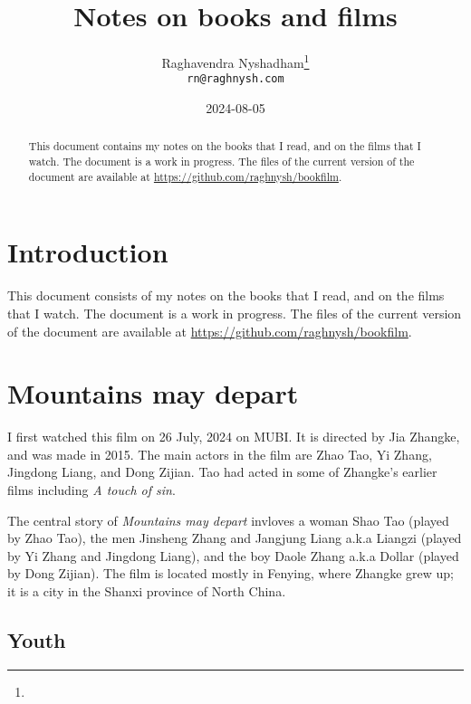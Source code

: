 \documentclass{article}
\title{Notes on books and films}
\author{Raghavendra Nyshadham\thanks{\cczero} \\
  {\normalsize\nolinkurl{rn@raghnysh.com}}}
\date{2024-08-05}
\begin{document}
\begin{titlingpage}
  \maketitle

  \begin{abstract}
    This document contains my notes on the books that I read, and on
    the films that I watch.  The document is a work in progress.  The
    files of the current version of the document are available at
    \url{https://github.com/raghnysh/bookfilm}.

  \end{abstract}
\end{titlingpage}

\tableofcontents

\section{Introduction}
\label{sec:113nrd0o}

This document consists of my notes on the books that I read, and on
the films that I watch.  The document is a work in progress.  The
files of the current version of the document are available at
\url{https://github.com/raghnysh/bookfilm}.

\section{Mountains may depart}
\label{sec:ov8yna0s}

I first watched this film on 26 July, 2024 on MUBI.  It is directed by
Jia Zhangke, and was made in 2015.  The main actors in the film are
Zhao Tao, Yi Zhang, Jingdong Liang, and Dong Zijian.  Tao had acted in
some of Zhangke's earlier films including \emph{A touch of sin}.

The central story of \emph{Mountains may depart} invloves a woman Shao
Tao (played by Zhao Tao), the men Jinsheng Zhang and Jangjung Liang
a.k.a Liangzi (played by Yi Zhang and Jingdong Liang), and the boy
Daole Zhang a.k.a Dollar (played by Dong Zijian).  The film is located
mostly in Fenying, where Zhangke grew up; it is a city in the Shanxi
province of North China.

\subsection{Youth}
\label{sec:jfdg3q3z}
\end{document}
